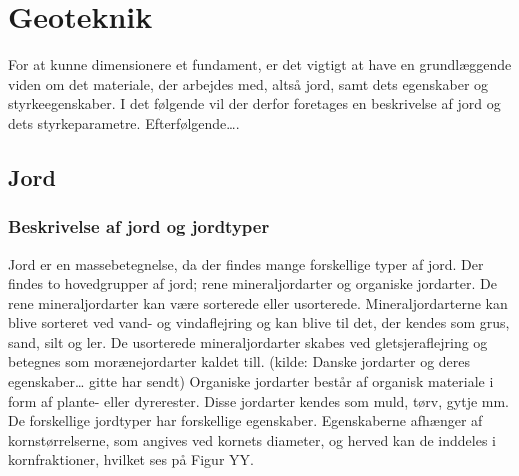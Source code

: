 \chapter{Geoteknik}

For at kunne dimensionere et fundament, er det vigtigt at have en grundlæggende viden om det materiale, der arbejdes med, altså jord, samt dets egenskaber og styrkeegenskaber. I det følgende vil der derfor foretages en beskrivelse af jord og dets styrkeparametre.
\newline \indent{     }  Efterfølgende….

\section{Jord}
\subsection{Beskrivelse af jord og jordtyper}
Jord er en massebetegnelse, da der findes mange forskellige typer af jord. Der findes to hovedgrupper af jord; rene mineraljordarter og organiske jordarter. 
\newline \indent{     }  De rene mineraljordarter kan være sorterede eller usorterede. Mineraljordarterne kan blive sorteret ved vand- og vindaflejring og kan blive til det, der kendes som grus, sand, silt og ler. De usorterede mineraljordarter skabes ved gletsjeraflejring og betegnes som morænejordarter kaldet till. (kilde: Danske jordarter og deres egenskaber… gitte har sendt)
\newline \indent{     }  Organiske jordarter består af organisk materiale i form af plante- eller dyrerester. Disse jordarter kendes som muld, tørv, gytje mm.
\newline \indent{     }  De forskellige jordtyper har forskellige egenskaber. Egenskaberne afhænger af kornstørrelserne, som angives ved kornets diameter, og herved kan de inddeles i kornfraktioner, hvilket ses på Figur YY.

